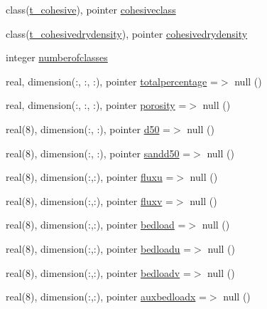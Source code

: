\begin{DoxyCompactItemize}
\item 
class(\mbox{\hyperlink{structmodulesediment_1_1t__cohesive}{t\+\_\+cohesive}}), pointer \mbox{\hyperlink{structmodulesediment_1_1t__sediment_aa94ccd43c8b563251455b3666ea3ecdf}{cohesiveclass}}
\item 
class(\mbox{\hyperlink{structmodulesediment_1_1t__cohesivedrydensity}{t\+\_\+cohesivedrydensity}}), pointer \mbox{\hyperlink{structmodulesediment_1_1t__sediment_a358d2d0ec18ff646b4b15b55bc9486f1}{cohesivedrydensity}}
\item 
integer \mbox{\hyperlink{structmodulesediment_1_1t__sediment_a7844c96ca55831066fa02d74da74710d}{numberofclasses}}
\item 
real, dimension(\+:, \+:, \+:), pointer \mbox{\hyperlink{structmodulesediment_1_1t__sediment_a60e5bad1a0434ccc5cc25c190502f60f}{totalpercentage}} =$>$ null ()
\item 
real, dimension(\+:, \+:, \+:), pointer \mbox{\hyperlink{structmodulesediment_1_1t__sediment_a75cace38bb43fa863222b446640d5cae}{porosity}} =$>$ null ()
\item 
real(8), dimension(\+:, \+:), pointer \mbox{\hyperlink{structmodulesediment_1_1t__sediment_a386840afc5ab50f15481aa3ebcf86638}{d50}} =$>$ null ()
\item 
real(8), dimension(\+:, \+:), pointer \mbox{\hyperlink{structmodulesediment_1_1t__sediment_a420c5055cf041b3185aefdfcd906b9c2}{sandd50}} =$>$ null ()
\item 
real(8), dimension(\+:,\+:), pointer \mbox{\hyperlink{structmodulesediment_1_1t__sediment_aa31a2ea8bbd6ef2e2ba0ffc4ecc26c4b}{fluxu}} =$>$ null ()
\item 
real(8), dimension(\+:,\+:), pointer \mbox{\hyperlink{structmodulesediment_1_1t__sediment_a1a7b162097c9fc1db962f74b816ce492}{fluxv}} =$>$ null ()
\item 
real(8), dimension(\+:,\+:), pointer \mbox{\hyperlink{structmodulesediment_1_1t__sediment_a52dc65f99c2c17549bf3465057d45dae}{bedload}} =$>$ null ()
\item 
real(8), dimension(\+:,\+:), pointer \mbox{\hyperlink{structmodulesediment_1_1t__sediment_a956ec53fff5395da7bb2008a75415da8}{bedloadu}} =$>$ null ()
\item 
real(8), dimension(\+:,\+:), pointer \mbox{\hyperlink{structmodulesediment_1_1t__sediment_ab27def95052cd0bc8b602b617cd8ee81}{bedloadv}} =$>$ null ()
\item 
real(8), dimension(\+:,\+:), pointer \mbox{\hyperlink{structmodulesediment_1_1t__sediment_a3a7fb5d6c5377c990c8e13376be159be}{auxbedloadx}} =$>$ null ()

\end{DoxyCompactItemize}
